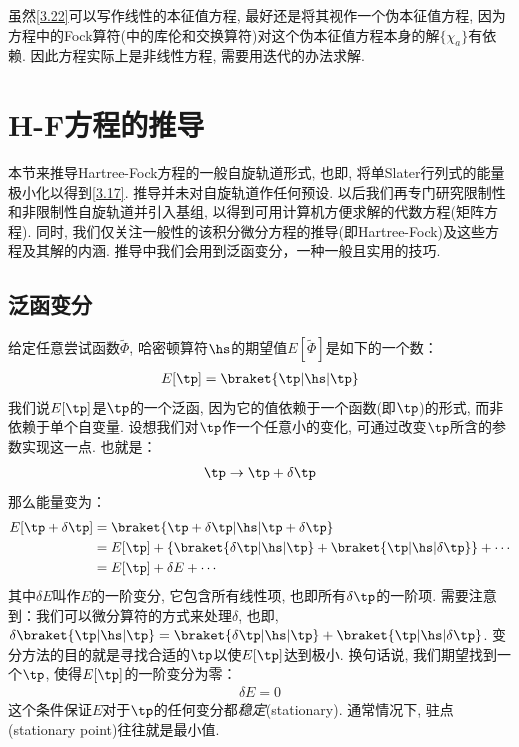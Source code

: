 虽然\autoref{3.22}可以写作线性的本征值方程, 
最好还是将其视作一个伪本征值方程, 
因为方程中的Fock算符(中的库伦和交换算符)对这个伪本征值方程本身的解$\{\chi_a \}$有依赖. 
因此\hft 方程实际上是非线性方程, 
需要用迭代的办法求解.

\section{H-F方程的推导}
本节来推导Hartree-Fock方程的一般自旋轨道形式, 
也即, 
将单Slater行列式的能量极小化以得到\autoref{3.17}. 
推导并未对自旋轨道作任何预设. 
以后我们再专门研究限制性和非限制性自旋轨道并引入基组, 
以得到可用计算机方便求解的代数方程(矩阵方程). 
同时, 
我们仅关注一般性的该积分微分方程的推导(即Hartree-Fock)及这些方程及其解的内涵. 
推导中我们会用到泛函变分，一种一般且实用的技巧. 

\subsection{泛函变分}
\label{sec3.2.1}
给定任意尝试函数$\tilde{\Phi}$, 
哈密顿算符$\hs$的期望值$E[\tilde{\Phi}]$是如下的一个数：
\begin{align}
	E[\tp] = \braket{\tp|\hs|\tp}
\end{align}
我们说$E[\tp]$是$\tp$的一个泛函, 
因为它的值依赖于一个函数(即$\tp$)的形式, 
而非依赖于单个自变量. 
设想我们对$\tp$作一个任意小的变化, 
可通过改变$\tp$所含的参数实现这一点. 
也就是：
\begin{align}
	\tp \to \tp + \delta\tp
\end{align} 
那么能量变为：
\begin{align}
	E[\tp+\delta\tp] & = \braket{\tp+\delta\tp|\hs|\tp+\delta\tp} \notag\\
	& = E[\tp] + \{ \braket{\delta\tp|\hs|\tp} + \braket{\tp|\hs|\delta\tp} \} + \cdots \notag\\
	& = E[\tp] + \delta E + \cdots
\end{align}
其中$\delta E$叫作$E$的一阶变分, 
它包含所有线性项, 
也即所有$\delta\tp$的一阶项. 
需要注意到：我们可以微分算符的方式来处理$\delta$, 
也即, 
$\delta\braket{\tp|\hs|\tp} = \braket{\delta\tp|\hs|\tp} + \braket{\tp|\hs|\delta\tp}$. 
变分方法的目的就是寻找合适的$\tp$以使$E[\tp]$达到极小. 
换句话说, 
我们期望找到一个$\tp$, 
使得$E[\tp]$的一阶变分为零：
\begin{align}
	\delta E = 0
\end{align}
这个条件保证$E$对于$\tp$的任何变分都\emph{稳定}(stationary). 
通常情况下, 
驻点(stationary point)往往就是最小值.


